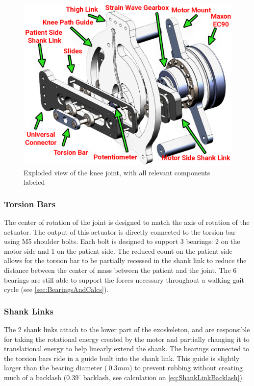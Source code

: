 \begin{figure} [ht!]
    \centering
    \includegraphics[width=0.8\linewidth]{Figures/Design/ExoKneeExplodedView.png}
    \caption{Exploded view of the knee joint, with all relevant components labeled}
    \label{fig:KneeJointExplodedView}
\end{figure}

\subsubsection{Torsion Bars}
The center of rotation of the joint is designed to match the axis of rotation of the actuator. The output of this actuator is directly connected to the torsion bar using M5 shoulder bolts. Each bolt is designed to support 3 bearings: 2 on the motor side and 1 on the patient side. The reduced count on the patient side allows for the torsion bar to be partially recessed in the shank link to reduce the distance between the center of mass between the patient and the joint. The 6 bearings are still able to support the forces necessary throughout a walking gait cycle (see \autoref{sec:BearingsAndCalcs}). 

\subsubsection{Shank Links}
The 2 shank links attach to the lower part of the exoskeleton, and are responsible for taking the rotational energy created by the motor and partially changing it to translational energy to help linearly extend the shank. The bearings connected to the torsion bars ride in a guide built into the shank link. This guide is slightly larger than the bearing diameter (\(~0.3mm\)) to prevent rubbing without creating much of a backlash (\(0.39^\circ\) backlash, see calculation on \autoref{eq:ShankLinkBacklash}).

